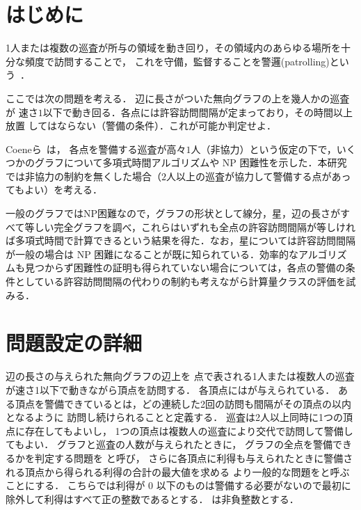 
\section{はじめに}

1人または複数の巡査が所与の領域を動き回り，その領域内のあらゆる場所を十分な頻度で訪問することで，
これを守備，監督することを警邏(patrolling)という~\cite{czyzowicz2011boundary}．


ここでは次の問題を考える．
辺に長さがついた無向グラフの上を幾人かの巡査が
速さ$1$以下で動き回る．各点には許容訪問間隔が定まっており，その時間以上放置
してはならない（警備の条件）．これが可能か判定せよ．

Coeneら~\cite{coene2011charlemagne}は，
各点を警備する巡査が高々$1$人（非協力）という仮定の下で，いくつかのグラフについて多項式時間アルゴリズムや NP 困難性を示した．本研究では非協力の制約を無くした場合（$2$人以上の巡査が協力して警備する点があってもよい）を考える．

一般のグラフではNP困難なので，グラフの形状として線分，星，辺の長さがすべて等しい完全グラフを調べ，これらはいずれも全点の許容訪問間隔が等しければ多項式時間で計算できるという結果を得た．なお，星については許容訪問間隔が一般の場合は NP 困難になることが既に知られている．効率的なアルゴリズムも見つからず困難性の証明も得られていない場合については，各点の警備の条件としている許容訪問間隔の代わりの制約も考えながら計算量クラスの評価を試みる．




\section{問題設定の詳細}

辺の長さの与えられた無向グラフの辺上を
点で表される1人または複数人の巡査が速さ1以下で動きながら頂点を訪問する．
各頂点には{\timelimit}が与えられている．
%
ある頂点を警備できているとは，どの連続した2回の訪問も間隔がその頂点の{\timelimit}以内となるように
訪問し続けられることと定義する．
巡査は2人以上同時に1つの頂点に存在してもよいし，
1つの頂点は複数人の巡査により交代で訪問して警備してもよい．
%
グラフと巡査の人数が与えられたときに，
グラフの全点を警備できるかを判定する問題を \decisionpp と呼び，
さらに各頂点に利得も与えられたときに警備される頂点から得られる利得の合計の最大値を求める
より一般的な問題を{\optpp}と呼ぶことにする．
こちらでは利得が $0$ 以下のものは警備する必要がないので最初に除外して利得はすべて正の整数であるとする．
{\timelimit}は非負整数とする．





